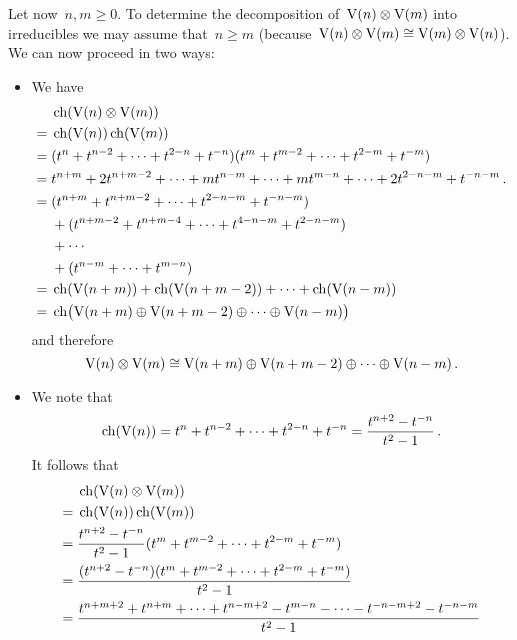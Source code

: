 Let now~$n, m \geq 0$.
To determine the decomposition of~$\operatorname{V}(n) \otimes \operatorname{V}(m)$ into irreducibles we may assume that~$n \geq m$ (because~$\operatorname{V}(n) \otimes \operatorname{V}(m) \cong \operatorname{V}(m) \otimes \operatorname{V}(n)$).
We can now proceed in two ways:
\begin{itemize}
  \item
    We have
    \begin{align*}
      {}&
      \operatorname{ch}(\operatorname{V}(n) \otimes \operatorname{V}(m))
      \\
      ={}&
      \operatorname{ch}(\operatorname{V}(n)) \operatorname{ch}(\operatorname{V}(m))
      \\
      ={}&
      (t^n + t^{n-2} + \dotsb + t^{2-n} + t^{-n})
      (t^m + t^{m-2} + \dotsb + t^{2-m} + t^{-m})
      \\
      ={}&
          t^{n+m}
      + 2 t^{n+m-2}
      + \dotsb
      + m t^{n-m}
      + \dotsb
      + m t^{m-n}
      + \dotsb
      + 2 t^{2-n-m}
      + t^{-n-m} \,.
      \\
      ={}&
      (t^{n+m} + t^{n+m-2} + \dotsb + t^{2-n-m} + t^{-n-m})
      \\
      {}&
      + (t^{n+m-2} + t^{n+m-4} + \dotsb + t^{4-n-m} + t^{2-n-m})
      \\
      {}&
      + \dotsb
      \\
      {}&
      + (t^{n-m} + \dotsb + t^{m-n})
      \\
      ={}&
      \operatorname{ch}(\operatorname{V}(n+m)) + \operatorname{ch}(\operatorname{V}(n+m-2)) + \dotsb + \operatorname{ch}(\operatorname{V}(n-m))
      \\
      ={}&
      \operatorname{ch}\bigl( \operatorname{V}(n+m) \oplus \operatorname{V}(n+m-2) \oplus \dotsb \oplus \operatorname{V}(n-m) \bigr)
    \end{align*}
    and therefore
    \[
      \operatorname{V}(n) \otimes \operatorname{V}(m)
      \cong
      \operatorname{V}(n+m) \oplus \operatorname{V}(n+m-2) \oplus \dotsb \oplus \operatorname{V}(n-m) \,.
    \]
  \item
    We note that
    \[
      \operatorname{ch}(\operatorname{V}(n))
      =
      t^n + t^{n-2} + \dotsb + t^{2-n} + t^{-n}
      =
      \frac{t^{n+2} - t^{-n}}{t^2 - 1} \,.
    \]
    It follows that
    \begin{align*}
      {}&
      \ch(\irr(n) \tensor \irr(m))
      \\
      ={}&
      \ch(\irr(n)) \ch(\irr(m))
      \\
      ={}&
      \frac{t^{n+2} - t^{-n}}{t^2 - 1} (t^m + t^{m-2} + \dotsb + t^{2-m} + t^{-m})
      \\
      ={}&
      \frac{(t^{n+2} - t^{-n})(t^m + t^{m-2} + \dotsb + t^{2-m} + t^{-m})}{t^2 - 1}
      \\
      ={}&
      \frac{ t^{n+m+2} + t^{n+m} + \dotsb + t^{n-m+2} - t^{m-n} - \dotsb - t^{-n-m+2} - t^{-n-m} }{t^2 - 1}

\end{align*}
\end{itemize}
